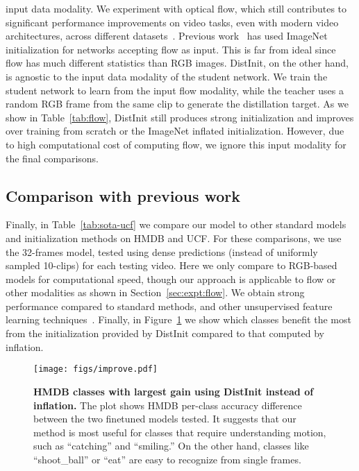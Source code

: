 \documentclass[10pt,twocolumn,letterpaper]{article}
\newcommand{\METHOD}[0]{DistInit}
\begin{document}
input data modality. We experiment with optical flow, which still contributes to significant performance
improvements on video tasks, even with modern
video architectures, across different datasets~\cite{carreira2017quo}. 
Previous work~\cite{carreira2017quo,WangL_16a} has used ImageNet initialization for networks accepting flow as input.
This is far from ideal since flow has much different statistics than RGB images. \METHOD{},
on the other hand, is agnostic to the input data modality of the student network. We train the student network
to learn from the input flow modality, while the teacher uses a random RGB frame from the same clip
to generate the distillation target.
As we show in Table~\ref{tab:flow},
\METHOD{} still produces strong initialization and improves over training from scratch or the ImageNet inflated
initialization. However, due to high computational cost of computing flow, we ignore this input modality for the final comparisons.






\subsection{Comparison with previous work}\label{sec:expt:sota}
Finally, in Table~\ref{tab:sota-ucf} we compare our model to other standard models and initialization methods on 
HMDB and UCF.
For these comparisons, we use the
32-frames model, tested using dense predictions (instead
of uniformly sampled 10-clips) for each testing video.
Here we only compare to RGB-based models for computational speed, though our approach is applicable 
to flow or other modalities as shown in Section~\ref{sec:expt:flow}.
We obtain strong performance compared to standard methods, and other unsupervised
feature learning techniques~\cite{misra2016unsupervised,diba2018spatio}.
Finally, in Figure~\ref{fig:improve} we show which classes benefit the most from the initialization provided by \METHOD{} compared to that computed by inflation.






\begin{figure}
    \centering
    \texttt{[image: figs/improve.pdf]}
    \caption{{\bf HMDB classes with largest gain using \METHOD{} instead of inflation.}
        The plot shows HMDB per-class accuracy difference between the two finetuned models tested. It suggests that our method is most useful for classes that require understanding motion, such as ``catching'' and  ``smiling.'' On the other hand, classes like ``shoot\_ball'' or ``eat'' are easy to recognize from single frames.
    }
    \label{fig:improve}
\end{figure}
\end{document}
